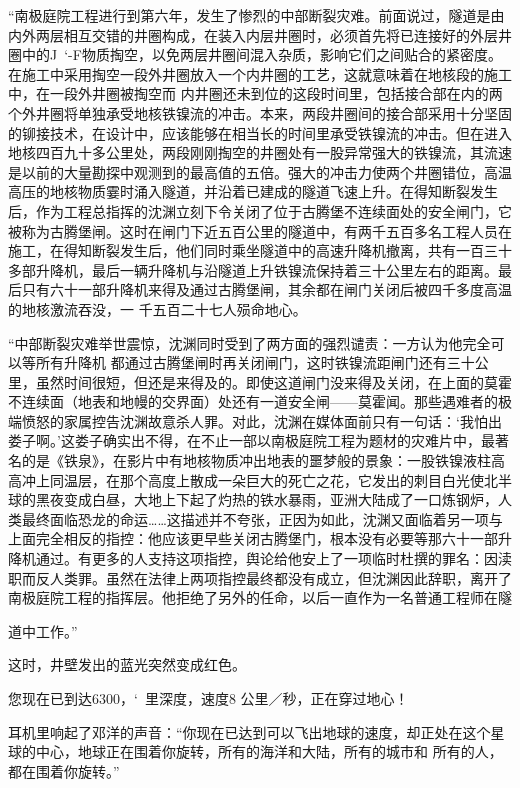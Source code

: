 \documentclass{article}
\begin{document}
“南极庭院工程进行到第六年，发生了惨烈的中部断裂灾难。前面说过，隧道是由内外两层相互交错的井圈构成，在装入内层井圈时，必须首先将已连接好的外层井圈中的J~‘-F物质掏空，以免两层井圈间混入杂质，影响它们之间贴合的紧密度。在施工中采用掏空一段外井圈放入一个内井圈的工艺，这就意味着在地核段的施工中，在一段外井圈被掏空而
\newpage
内井圈还未到位的这段时间里，包括接合部在内的两个外井圈将单独承受地核铁镍流的冲击。本来，两段井圈间的接合部采用十分坚固的铆接技术，在设计中，应该能够在相当长的时间里承受铁镍流的冲击。但在进入地核四百九十多公里处，两段刚刚掏空的井圈处有一股异常强大的铁镍流，其流速是以前的大量勘探中观测到的最高值的五倍。强大的冲击力使两个井圈错位，高温高压的地核物质霎时涌入隧道，并沿着已建成的隧道飞速上升。在得知断裂发生后，作为工程总指挥的沈渊立刻下令关闭了位于古腾堡不连续面处的安全闸门，它被称为古腾堡闸。这时在闸门下近五百公里的隧道中，有两千五百多名工程人员在施工，在得知断裂发生后，他们同时乘坐隧道中的高速升降机撤离，共有一百三十多部升降机，最后一辆升降机与沿隧道上升铁镍流保持着三十公里左右的距离。最后只有六十一部升降机来得及通过古腾堡闸，其余都在闸门关闭后被四千多度高温的地核激流吞没，一
千五百二十七人殒命地心。 

“中部断裂灾难举世震惊，沈渊同时受到了两方面的强烈谴责：一方认为他完全可以等所有升降机
\newpage
都通过古腾堡闸时再关闭闸门，这时铁镍流距闸门还有三十公里，虽然时间很短，但还是来得及的。即使这道闸门没来得及关闭，在上面的莫霍不连续面（地表和地幔的交界面）处还有一道安全闸——莫霍闻。那些遇难者的极端愤怒的家属控告沈渊故意杀人罪。对此，沈渊在媒体面前只有一句话：‘我怕出娄子啊。’这娄子确实出不得，在不止一部以南极庭院工程为题材的灾难片中，最著名的是《铁泉》，在影片中有地核物质冲出地表的噩梦般的景象：一股铁镍液柱高高冲上同温层，在那个高度上散成一朵巨大的死亡之花，它发出的刺目白光使北半球的黑夜变成白昼，大地上下起了灼热的铁水暴雨，亚洲大陆成了一口炼钢炉，人类最终面临恐龙的命运……这描述并不夸张，正因为如此，沈渊又面临着另一项与上面完全相反的指控：他应该更早些关闭古腾堡门，根本没有必要等那六十一部升降机通过。有更多的人支持这项指控，舆论给他安上了一项临时杜撰的罪名：因渎职而反人类罪。虽然在法律上两项指控最终都没有成立，但沈渊因此辞职，离开了南极庭院工程的指挥层。他拒绝了另外的任命，以后一直作为一名普通工程师在隧

\newpage
道中工作。” 


这时，井壁发出的蓝光突然变成红色。 

您现在已到达6300，‘~里深度，速度8
公里／秒，正在穿过地心！ 

耳机里响起了邓洋的声音：“你现在已达到可以飞出地球的速度，却正处在这个星球的中心，地球正在围着你旋转，所有的海洋和大陆，所有的城市和
所有的人，都在围着你旋转。” 
\end{document}
